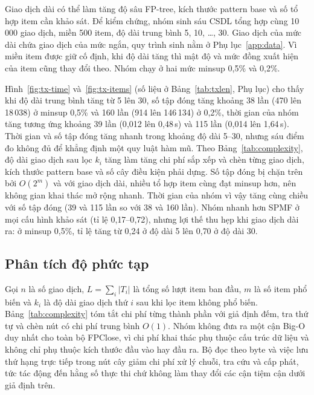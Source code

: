 Giao dịch dài có thể làm tăng độ sâu FP-tree, kích thước pattern base và số tổ hợp item cần khảo sát. Để kiểm
chứng, nhóm sinh sáu CSDL tổng hợp cùng 10\,000 giao dịch, miền 500 item, độ dài trung bình 5, 10, \ldots, 30. Giao
dịch của mức dài chứa giao dịch của mức ngắn, quy trình sinh nằm ở Phụ lục~\ref{app:data}. Vì miền item được giữ cố
định, khi độ dài tăng thì mật độ và mức đồng xuất hiện của item cũng thay đổi theo. Nhóm chạy ở hai mức minsup
0{,}5\% và 0{,}2\%.


Hình~\ref{fig:tx-time} và~\ref{fig:tx-items} (số liệu ở Bảng~\ref{tab:txlen}, Phụ lục) cho thấy khi độ dài trung
bình tăng từ 5 lên 30, số tập đóng tăng khoảng 38 lần (470 lên 18\,038) ở minsup 0{,}5\% và 160 lần (914 lên
146\,134) ở 0{,}2\%, thời gian của nhóm tăng tương ứng khoảng 39 lần (0{,}012 lên 0{,}48\,s) và 115 lần (0{,}014 lên
1{,}64\,s). Thời gian và số tập đóng tăng nhanh trong khoảng độ dài 5–30, nhưng sáu điểm đo không đủ để khẳng định một
quy luật hàm mũ. Theo Bảng~\ref{tab:complexity}, độ dài giao dịch sau lọc $k_i$ tăng làm tăng chi phí sắp xếp và
chèn từng giao dịch, kích thước pattern base và số cây điều kiện phải dựng. Số tập đóng bị chặn trên bởi $O(2^m)$ và
với giao dịch dài, nhiều tổ hợp item cùng đạt minsup hơn, nên không gian khai thác mở rộng nhanh. Thời gian của nhóm
vì vậy tăng cùng chiều với số tập đóng (39 và 115 lần so với 38 và 160 lần). Nhóm nhanh hơn SPMF ở mọi cấu hình khảo
sát (tỉ lệ 0{,}17–0{,}72), nhưng lợi thế thu hẹp khi giao dịch dài ra: ở minsup 0{,}5\%, tỉ lệ tăng từ 0{,}24 ở độ dài
5 lên 0{,}70 ở độ dài 30.

\subsection{Phân tích độ phức tạp}
\label{sec:complexity}

Gọi $n$ là số giao dịch, $L=\sum_i |T_i|$ là tổng số lượt item ban đầu, $m$ là số item phổ biến và $k_i$ là độ dài
giao dịch thứ $i$ sau khi lọc item không phổ biến. Bảng~\ref{tab:complexity} tóm tắt chi phí từng thành phần với giả
định đếm, tra thứ tự và chèn nút có chi phí trung bình $O(1)$. Nhóm không đưa ra một cận Big-O duy nhất cho toàn bộ
FPClose, vì chi phí khai thác phụ thuộc cấu trúc dữ liệu và không chỉ phụ thuộc kích thước đầu vào hay đầu ra. Bộ
đọc theo byte và việc lưu thứ hạng trực tiếp trong nút cây giảm chi phí xử lý chuỗi, tra cứu và cấp phát, tức tác động
đến hằng số thực thi chứ không làm thay đổi các cận tiệm cận dưới giả định trên.


